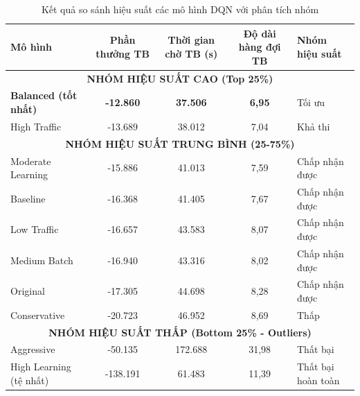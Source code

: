 \begin{table}[!htp]
    \centering
    \caption{Kết quả so sánh hiệu suất các mô hình DQN với phân tích nhóm}
    \label{tab:model_performance_comparison}
    \begin{tabular}{|l|c|c|c|l|}
        \hline 
        \textbf{Mô hình}  & \textbf{Phần thưởng TB} & \textbf{Thời gian chờ TB (s)} & \textbf{Độ dài hàng đợi TB} & \textbf{Nhóm hiệu suất} \\
        \hline 
        \multicolumn{5}{|c|}{\textbf{NHÓM HIỆU SUẤT CAO (Top 25\%)}} \\
        \hline
        \textbf{Balanced (tốt nhất)} & \textbf{-12.860}     & \textbf{37.506}            & \textbf{6,95}               & Tối ưu \\
        \hline
        High Traffic               & -13.689              & 38.012                     & 7,04                        & Khả thi \\
        \hline
        \multicolumn{5}{|c|}{\textbf{NHÓM HIỆU SUẤT TRUNG BÌNH (25-75\%)}} \\
        \hline
        Moderate Learning          & -15.886              & 41.013                     & 7,59                        & Chấp nhận được \\
        \hline
        Baseline                   & -16.368              & 41.405                     & 7,67                        & Chấp nhận được \\
        \hline
        Low Traffic                & -16.657              & 43.583                     & 8,07                        & Chấp nhận được \\
        \hline
        Medium Batch               & -16.940              & 43.316                     & 8,02                        & Chấp nhận được \\
        \hline
        Original                   & -17.305              & 44.698                     & 8,28                        & Chấp nhận được \\
        \hline
        Conservative               & -20.723              & 46.952                     & 8,69                        & Thấp \\
        \hline
        \multicolumn{5}{|c|}{\textbf{NHÓM HIỆU SUẤT THẤP (Bottom 25\% - Outliers)}} \\
        \hline
        Aggressive                 & -50.135              & 172.688                    & 31,98                       & Thất bại \\
        \hline
        High Learning (tệ nhất)              & -138.191             & 61.483                     & 11,39                       & Thất bại hoàn toàn \\
        \hline
    \end{tabular}
\end{table}

